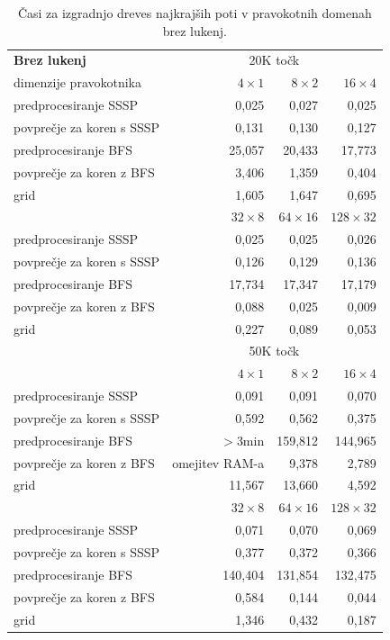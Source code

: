 \documentclass[a4paper, 12pt]{book}
\begin{document}
\begin{table}[htp]
\begin{center}
\begin{tabular}{l*{3}{r}}
\textbf{Brez lukenj} & \multicolumn{3}{c}{20K točk}\\						
dimenzije pravokotnika	&	$4\times 1$	&	$8\times 2$	&	$16\times 4$ \\
\hline
predprocesiranje SSSP	&	0,025	&	0,027	&	0,025		\\
povprečje za koren s SSSP	&	0,131	&	0,130	&	0,127		\\
predprocesiranje BFS 	&	25,057	&	20,433	&	17,773		\\
povprečje za koren z BFS	&	3,406	&	1,359	&	0,404		\\
grid	&	1,605	&	1,647	&	0,695	\vspace{.2cm}	\\

&	$32\times 8$	&	$64\times 16$	&	$128\times 32$	\\
\hline
predprocesiranje SSSP &	0,025	&	0,025	&	0,026 \\
povprečje za koren s SSSP &	0,126	&	0,129	&	0,136 \\
predprocesiranje BFS &	17,734	&	17,347	&	17,179 \\
povprečje za koren z BFS &	0,088	&	0,025	&	0,009 \\
grid &	0,227	&	0,089	&	0,053 \vspace{.2cm} \\
\hline
  & \multicolumn{3}{c}{50K točk}  \\						
&	$4\times 1$	&	$8\times 2$	&	$16\times 4$ \\
\hline
predprocesiranje SSSP	&	0,091	&	0,091	&	0,070		\\
povprečje za koren s SSSP	&	0,592	&	0,562	&	0,375		\\
predprocesiranje BFS	&	$>$3min	&	159,812	&	144,965		\\
povprečje za koren z BFS	& omejitev RAM-a & 9,378	&	2,789		\\
grid				&	11,567	&	13,660	&	4,592	\\

&	$32\times 8$	&	$64\times 16$	&	$128\times 32$	\\
\hline
predprocesiranje SSSP &	0,071	&	0,070	&	0,069 \\
povprečje za koren s SSSP &	0,377	&	0,372	&	0,366 \\
predprocesiranje BFS &	140,404	&	131,854	&	132,475 \\
povprečje za koren z BFS &	0,584	&	0,144	&	0,044 \\
grid &	1,346	&	0,432	&	0,187
\end{tabular}
\caption{Časi za izgradnjo dreves najkrajših poti v pravokotnih domenah brez lukenj.}
\label{table1}
\end{center}
\end{table}
\end{document}
